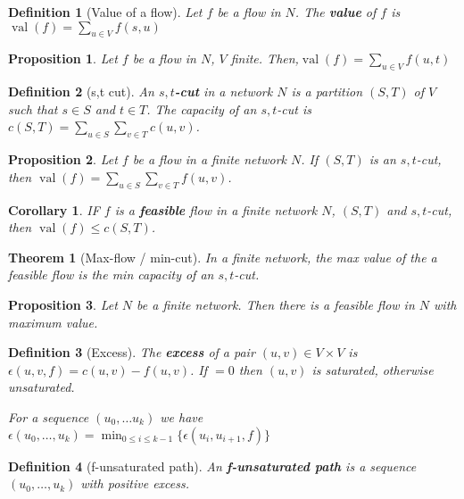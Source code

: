 \documentclass{article}
\newcommand{\st}{such that }
\DeclareMathOperator*{\val}{val}
\newtheorem*{definition}{Definition}
\newtheorem*{proposition}{Proposition}
\newtheorem*{theorem}{Theorem}
\newtheorem*{corollary}{Corollary}
\begin{document}
\begin{definition}[Value of a flow]
    Let $ f $ be a flow in $ N $. The \textbf{value} of $ f $ is $ \val(f) = \sum_{u \in V}^{}f(s, u) $
\end{definition}

\begin{proposition}
    Let $ f $ be a flow in $ N $, $ V $ finite. Then,$ \val(f) = \sum_{u \in V}^{}f(u, t) $
\end{proposition}

\begin{definition}[s,t cut]
    An \textbf{$ s, t $-cut} in a network $ N $ is a partition $ (S, T) $ of $ V $ \st $ s \in S $ and $ t \in T $.
    The capacity of an $ s,t $-cut is $ c(S, T) = \sum_{u\in S}^{}\sum_{v \in T}^{}c(u,v) $.
\end{definition}

\begin{proposition}
    Let $ f $ be a flow in a finite network $ N $. If $ (S, T) $ is an $ s,t $-cut, then
    $ \val(f) = \sum_{u \in S}^{}\sum_{v \in T}^{}f(u,v) $.
\end{proposition}

\begin{corollary}
    IF $ f $ is a \textbf{feasible} flow in a finite network $ N $, $ (S, T) $ and $ s,t $-cut, then
    $ \val(f) \leq c(S,T) $.
\end{corollary}

\begin{theorem}[Max-flow / min-cut]
    In a finite network, the max value of the a feasible flow is the min capacity of an $ s,t $-cut.
\end{theorem}

\begin{proposition}
    Let $ N $ be a finite network. Then there is a feasible flow in $ N $ with maximum value.
\end{proposition}

\begin{definition}[Excess]
    The \textbf{excess} of a pair $ (u,v) \in V \times V $ is $ \epsilon(u,v,f) = c(u,v) - f(u,v) $. If $ = 0 $ then
    $ (u,v) $ is saturated, otherwise unsaturated.

    For a sequence $ (u_0, \dots u_k) $ we have $ \epsilon(u_0, \dots, u_ k) = \min_{0\leq i \leq k-1}\{\epsilon(u_i, u_{i+1}, f)\}$
\end{definition}

\begin{definition}[f-unsaturated path]
    An \textbf{f-unsaturated path} is a sequence $ (u_0, \dots, u_k) $ with positive excess.
\end{definition}
\end{document}
